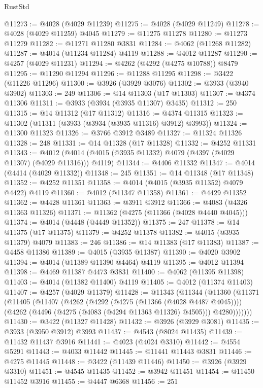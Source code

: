 \begin{lexlean}{RustStd}
\begin{coremodule}
@11273 := @4028 (@4029 @11239)
@11275 := @4028 (@4029 @11249)
@11278 := @4028 (@4029 @11259) @4045
@11279 := @11275 @11278
@11280 := @11273 @11279
@11282 := @11271 @11280 @3831
@11284 := @4062 (@11268 @11282)
@11287 := @4014 (@11234 @11284) @4119
@11288 := @4012 @11287
@11290 := @4257 (@4029 @11231)
@11294 := @4262 (@4292 (@4275 @10788)) @8479
@11295 := @11290 @11294
@11296 := @11288 @11295
@11298 := @3422 (@11226 @11296)
@11300 := @3926 (@3929 @3076)
@11302 := @3933 (@3940 @3902)
@11303 := 249
@11306 := @14 @11303 (@17 @11303)
@11307 := @4374 @11306
@11311 := @3933 (@3934 (@3935 @11307) @3435)
@11312 := 250
@11315 := @14 @11312 (@17 @11312)
@11316 := @4374 @11315
@11323 := @11302 (@11311 (@3933 (@3934 (@3935 @11316) @3912) @3993))
@11324 := @11300 @11323
@11326 := @3766 @3912 @3489
@11327 := @11324 @11326
@11328 := 248
@11331 := @14 @11328 (@17 @11328)
@11332 := @4252 @11331
@11343 := @4012 (@4014 (@4015 (@3935 @11332) @4079 (@4397 (@4029 @11307) (@4029 @11316))) @4119)
@11344 := @4406 @11332
@11347 := @4014 (@4414 (@4029 @11332))
@11348 := 245
@11351 := @14 @11348 (@17 @11348)
@11352 := @4252 @11351
@11358 := @4014 (@4015 (@3935 @11352) @4079 @4422) @4119
@11360 := @4012 (@11347 @11358)
@11361 := @4429 @11352
@11362 := @4428 @11361
@11363 := @3911 @3912
@11366 := @4083 (@4326 @11363 @11326)
@11371 := @11362 (@4275 (@11366 (@4028 @4440 @4045)))
@11374 := @4014 (@4448 (@4449 @11352))
@11375 := 247
@11378 := @14 @11375 (@17 @11375)
@11379 := @4252 @11378
@11382 := @4015 (@3935 @11379) @4079
@11383 := 246
@11386 := @14 @11383 (@17 @11383)
@11387 := @4458 @11386
@11389 := @4015 (@3935 @11387)
@11390 := @4020 @3902
@11394 := @4014 (@11389 @11390 @4464) @4119
@11395 := @4012 @11394
@11398 := @4469 @11387 @4473 @3831
@11400 := @4062 (@11395 @11398)
@11403 := @4014 (@11382 @11400) @4119
@11405 := @4012 (@11374 @11403)
@11407 := @4257 (@4029 @11379)
@11428 := @11343
    (@11344
      (@11360
        (@11371
          (@11405
            (@11407
              (@4262
                (@4292 (@4275 (@11366 (@4028 @4487 @4045))))
                (@4262 (@4496 (@4275 (@4083 (@4294 @11363 @11326) @4505))) @4280)))))))
@11430 := @3422 (@11327 @11428)
@11432 := @3926 (@3929 @3081)
@11435 := @3933 (@3950 @3912) @3993
@11437 := @4543 (@8024 @11435)
@11439 := @11432 @11437 @3916
@11441 := @4023 (@4024 @3310)
@11442 := @4554 @5291
@11443 := @4033 @11442
@11445 := @11441 @11443 @3831
@11446 := @4275 @11445
@11448 := @3422 (@11439 @11446)
@11450 := @3926 (@3929 @3310)
@11451 := @4545 @11435
@11452 := @3942 @11451
@11454 := @11450 @11452 @3916
@11455 := @4447 @6368
@11456 := 251

\end{coremodule}
\end{lexlean}

